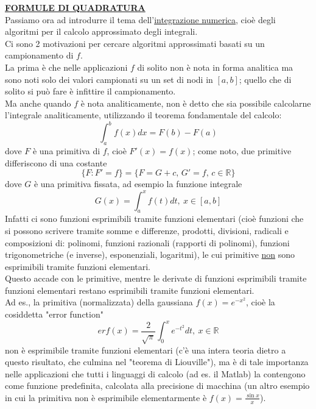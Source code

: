 \documentclass[12pt,a4paper]{article}
\begin{document}
\textbf{\underline{FORMULE DI QUADRATURA}}\\
Passiamo ora ad introdurre il tema dell'\underline{integrazione numerica}, cioè degli algoritmi per il calcolo approssimato degli integrali.\\Ci sono 2 motivazioni per cercare algoritmi approssimati basati su un campionamento di $f$.\\La prima è che nelle applicazioni $f$ di solito non è nota in forma analitica ma sono noti solo dei valori campionati su un set di nodi in $[a,b]$; quello che di solito si può fare è infittire il campionamento.\\
Ma anche quando $f$ è nota analiticamente, non è detto che sia possibile calcolarne l'integrale analiticamente, utilizzando il teorema fondamentale del calcolo:
\begin{equation*}
    \int_a^b f(x)dx=F(b)-F(a)
\end{equation*}
dove $F$ è una primitiva di $f$, cioè $F'(x)=f(x)$; come noto, due primitive differiscono di una costante
\begin{equation*}
    \{F:F'=f\}=\{F=G+c,\,G'=f,\,c\in\mathbb{R}\}
\end{equation*}
dove $G$ è una primitiva fissata, ad esempio la funzione integrale
\begin{equation*}
    G(x) = \int_{a}^{x} f(t) dt, \ x \in [a,b]
\end{equation*}
Infatti ci sono funzioni esprimibili tramite funzioni elementari (cioè funzioni che si possono scrivere tramite somme e differenze, prodotti, divisioni, radicali e composizioni di: polinomi, funzioni razionali (rapporti di polinomi), funzioni trigonometriche (e inverse), esponenziali, logaritmi), le cui primitive \underline{non} sono esprimibili tramite funzioni elementari. \\
Questo accade con le primitive, mentre le derivate di funzioni esprimibili tramite funzioni elementari restano esprimibili tramite funzioni elementari. \\
Ad es., la primitiva (normalizzata) della gaussiana $f(x) = e^{-x^2}$, cioè la cosiddetta "error function"
\begin{equation*}
    erf(x) = \frac{2}{\sqrt{\pi}} \int_0^x e^{-t^2} dt, \ x \in \mathbb{R}
\end{equation*}
non è esprimibile tramite funzioni elementari (c'è una intera teoria dietro a questo risultato, che culmina nel "teorema di Liouville"), ma è di tale importanza nelle applicazioni che tutti i linguaggi di calcolo (ad es. il Matlab) la contengono come funzione predefinita, calcolata alla precisione di macchina (un altro esempio in cui la primitiva non è esprimibile elementarmente è $f(x) = \frac{\sin{x}}{x}$).\\
\end{document}
